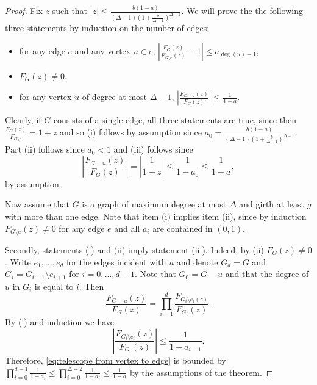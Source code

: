 \documentclass[10pt,a4paper]{amsart}
\begin{document}
\begin{proof}
Fix $z$ such that $|z|\leq \frac{b(1-a)}{(\Delta-1)(1+\tfrac{b}{\Delta-1})^{\Delta-1}}$.
We will prove the the following three statements by induction on the number of edges:
\begin{itemize}
    \item[(i)] for any edge $e$ and any vertex $u\in e$, $\left|\frac{F_G(z)}{F_{G\setminus e}(z)}-1\right|\leq a_{\deg(u)-1}$,
    \item[(ii)] $F_G(z)\neq 0$,
    \item[(iii)] for any vertex $u$ of degree at most $\Delta-1$, $\left|\frac{F_{G-u}(z)}{F_{G}(z)}\right|\leq \frac{1}{1-a}$.
\end{itemize}
Clearly, if $G$ consists of a single edge, all three statements are true, since then $\tfrac{F_G(z)}{F_{G\setminus e}}=1+z$ and so (i) follows by assumption since $a_0=\frac{b(1-a)}{(\Delta-1)(1+\tfrac{b}{\Delta-1})^{\Delta-1}}$.
Part (ii) follows since $a_0<1$ and (iii) follows since 
\[
\left |\frac{F_{G-u}(z)}{F_G(z)}\right |=\left |\frac{1}{1+z}\right |\leq \frac{1}{1-a_0}\leq \frac{1}{1-a},
\]
by assumption.

Now assume that $G$ is a graph of maximum degree at most $\Delta$ and girth at least $g$ with more than one edge.
Note that item (i) implies item (ii), since by induction $F_{G\setminus e}(z)\neq 0$ for any edge $e$ and all $a_i$ are contained in $(0,1)$.

Secondly, statements (i) and (ii) imply statement (iii).
Indeed, by (ii) $F_G(z)\neq 0$. Write $e_1,\ldots,e_d$ for the edges incident with $u$ and denote $G_d=G$ and $G_i=G_{i+1}\setminus e_{i+1}$ for $i=0,\ldots,d-1$.
Note that $G_0=G-u$ and that the degree of $u$ in $G_{i}$ is equal to $i.$
Then 
\begin{equation}\label{eq:telescope from vertex to edge}
 \frac{F_{G-u}(z)}{F_{G}(z)}=\prod_{i=1}^{d} \frac{F_{G_{i}\setminus e_i(z)}}{{F_{G_{i}}}(z)}. \end{equation}
By (i) and induction we have 
\[
\left|\frac{F_{G_i\setminus e_i}(z)}{F_{G_i}(z)}\right|\leq \frac{1}{1-a_{i-1}}.
\]
Therefore, \eqref{eq:telescope from vertex to edge} is bounded by $\prod_{i=0}^{d-1}\tfrac{1}{1-a_i}\leq \prod_{i=0}^{\Delta-2}\tfrac{1}{1-a_i}\leq \tfrac{1}{1-a}$ by the assumptions of the theorem.


\end{proof}
\end{document}
